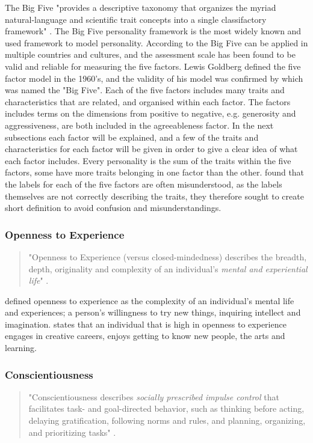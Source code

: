 The Big Five "provides a descriptive taxonomy that organizes the myriad natural-language and scientific trait concepts into a single classifactory framework" \citep{John1999}. The Big Five personality framework is the most widely known and used framework to model personality. According to \cite{Ackerman2017} the Big Five can be applied in multiple countries and cultures, and the assessment scale has been found to be valid and reliable for measuring the five factors. Lewis Goldberg defined the five factor model in the 1960's, and the validity of his model was confirmed by \cite{mccrae1987} which was named the "Big Five". Each of the five factors includes many traits and characteristics that are related, and organised within each factor. The factors  includes terms on the dimensions from positive to negative, e.g. generosity and aggressiveness, are both included in the agreeableness factor. In the next subsections each factor will be explained, and a few of the traits and characteristics for each factor will be given in order to give a clear idea of what each factor includes. Every personality is the sum of the traits within the five factors, some have more traits belonging in one factor than the other. \cite{John1999} found that the labels for each of the five factors are often misunderstood, as the labels themselves are not correctly describing the traits, they therefore sought to create short definition to avoid confusion and misunderstandings.

\subsubsection{Openness to Experience}

\begin{quote}
    "Openness to Experience (versus closed-mindedness) describes the breadth, depth, originality and complexity of an individual's \textit{mental and experiential life}" \citep[p.121]{John1999}.
\end{quote}

\cite{John1999} defined openness to experience as the complexity of an individual's mental life and experiences; a person's willingness to try new things, inquiring intellect and imagination. \cite{Lebowitz2016} states that an individual that is high in openness to experience engages in creative careers, enjoys getting to know new people, the arts and learning.

\subsubsection{Conscientiousness}
\begin{quote}
    "Conscientiousness describes \textit{socially prescribed impulse control} that facilitates task- and goal-directed behavior, such as thinking before acting, delaying gratification, following norms and rules, and planning, organizing, and prioritizing tasks" \citep[p.121]{John1999}.
\end{quote}

